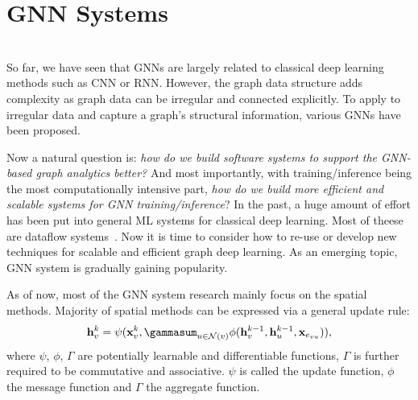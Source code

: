 \section{GNN Systems} \hfill \\
\label{sec:gnnsys}
So far, we have seen that GNNs are largely related to classical deep learning methods such as CNN or RNN. However, the graph data structure adds complexity as graph data can be irregular and connected explicitly. To apply to irregular data and capture a graph's structural information, various GNNs have been proposed. 

Now a natural question is: \textit{how do we build software systems to support the GNN-based graph analytics better?} And most importantly, with training/inference being the most computationally intensive part, \textit{how do we build more efficient and scalable systems for GNN training/inference}? In the past, a huge amount of effort has been put into general ML systems for classical deep learning. Most of theese are dataflow systems~\cite{spark, tf, torch}. Now it is time to consider how to re-use or develop new techniques for scalable and efficient graph deep learning. As an emerging topic, GNN system is gradually gaining popularity. 

As of now, most of the GNN system research mainly focus on the spatial methods. Majority of spatial methods can be expressed via a general update rule:
\begin{gather}
\label{eq:mmp}
\mathbf{h}_v ^k = \psi ( \mathbf{x}_v^k, \gammasum_{u \in {\mathcal {N}}(v)}  \phi(\mathbf{h}_v^{k-1}, \mathbf{h}_u^{k-1}, \mathbf{x}_{e_{vu}})),
\end{gather} 
where $\psi$, $\phi$, $\Gamma$ are potentially learnable and differentiable functions, $\Gamma$ is further required to be commutative and associative. $\psi$ is called the update function, $\phi$ the message function and $\Gamma$ the aggregate function.



